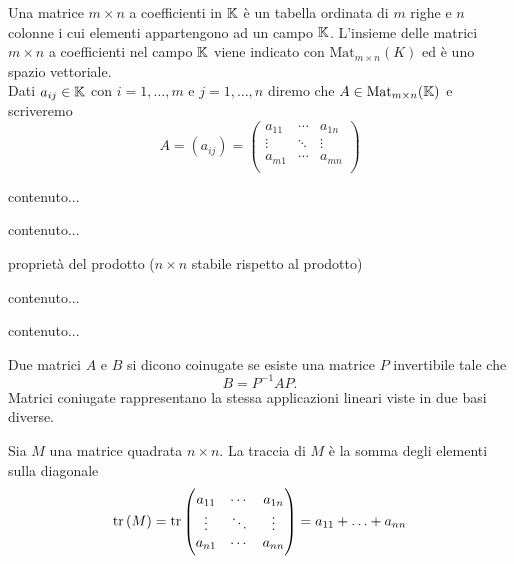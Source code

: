 
\begin{definition}[Matrice]
	Una matrice $ m \times n $ a coefficienti in $ \mathbb{K} $ è un tabella ordinata di $ m $ righe e $ n $ colonne i cui elementi appartengono ad un campo $ \mathbb{K} $. L'insieme delle matrici $ m \times n $ a coefficienti nel campo $ \mathbb{K} $ viene indicato con $ \mathrm{Mat}_{m \times n}{(K)} $ ed è uno spazio vettoriale. \\ Dati $ a_{ij} \in \mathbb{K} $ con $ i = 1, \ldots, m $ e $ j = 1, \ldots, n $ diremo che $ A \in \mathrm{Mat}_{m \times n} (\mathbb{K}) $ e scriveremo
	\[ A = (a_{ij}) =
	\begin{pmatrix}
		a_{11} & \cdots  & a_{1n} \\
		\vdots & \ddots & \vdots \\
		a_{m1} & \cdots  & a_{mn} \\
	\end{pmatrix}\]
\end{definition}

\begin{definition}
	contenuto...
\end{definition}

\begin{definition}
	contenuto...
\end{definition}

\begin{propriety}
	\textsf{proprietà del prodotto ($ n \times n $ stabile rispetto al prodotto)}
\end{propriety}

\begin{definition}
	contenuto...
\end{definition}

\begin{propriety}
	contenuto...
\end{propriety}

\begin{definition}
	Due matrici $ A $ e $ B $ si dicono coinugate se esiste una matrice $ P $ invertibile tale che \[B = P^{-1} A P.\] Matrici coniugate rappresentano la stessa applicazioni lineari viste in due basi diverse. 
\end{definition}

\begin{definition}[Traccia]
	Sia $ M $ una matrice quadrata $ n \times n $. La traccia di $ M $ è la somma degli elementi sulla diagonale 
	\[\operatorname{tr}{(M)} = \operatorname{tr}{ 
	\begin{pmatrix}
	a_{11} & \cdots  & a_{1n} \\
	\vdots & \ddots & \vdots \\
	a_{n1} & \cdots  & a_{nn} \\
	\end{pmatrix}}
	= a_{11} + \ldots + a_{nn}\]
\end{definition}

